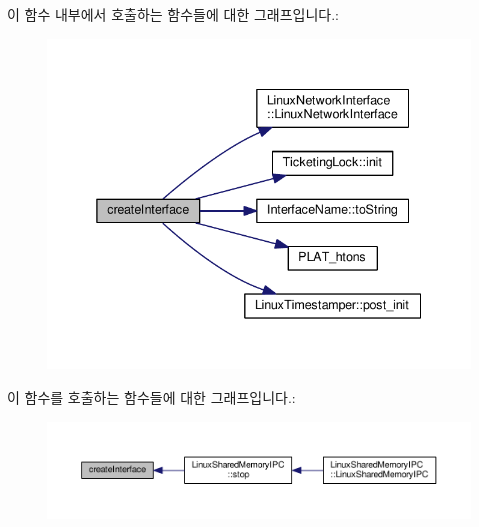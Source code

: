 이 함수 내부에서 호출하는 함수들에 대한 그래프입니다.\+:
\nopagebreak
\begin{figure}[H]
\begin{center}
\leavevmode
\includegraphics[width=338pt]{class_linux_network_interface_factory_ad98c21d0fa2f176fa0c8c10ed95f9ab8_cgraph}
\end{center}
\end{figure}




이 함수를 호출하는 함수들에 대한 그래프입니다.\+:
\nopagebreak
\begin{figure}[H]
\begin{center}
\leavevmode
\includegraphics[width=350pt]{class_linux_network_interface_factory_ad98c21d0fa2f176fa0c8c10ed95f9ab8_icgraph}
\end{center}
\end{figure}


